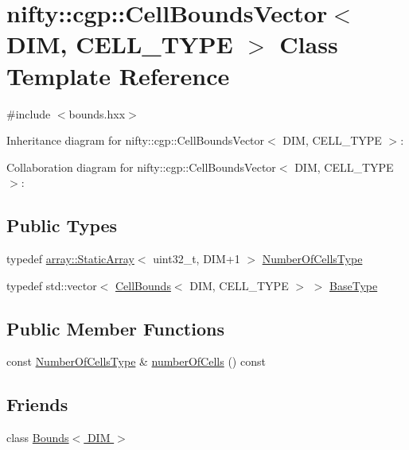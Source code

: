 \hypertarget{classnifty_1_1cgp_1_1CellBoundsVector}{}\section{nifty\+:\+:cgp\+:\+:Cell\+Bounds\+Vector$<$ D\+I\+M, C\+E\+L\+L\+\_\+\+T\+Y\+P\+E $>$ Class Template Reference}
\label{classnifty_1_1cgp_1_1CellBoundsVector}


{\ttfamily \#include $<$bounds.\+hxx$>$}



Inheritance diagram for nifty\+:\+:cgp\+:\+:Cell\+Bounds\+Vector$<$ D\+I\+M, C\+E\+L\+L\+\_\+\+T\+Y\+P\+E $>$\+:


Collaboration diagram for nifty\+:\+:cgp\+:\+:Cell\+Bounds\+Vector$<$ D\+I\+M, C\+E\+L\+L\+\_\+\+T\+Y\+P\+E $>$\+:
\subsection*{Public Types}
\begin{DoxyCompactItemize}
\item 
typedef \hyperlink{namespacenifty_1_1array_a683f151f19c851754e0c6d55ed16a0c2}{array\+::\+Static\+Array}$<$ uint32\+\_\+t, D\+I\+M+1 $>$ \hyperlink{classnifty_1_1cgp_1_1CellBoundsVector_a4db6e267b7ec9e9bfd2db914354c49f9}{Number\+Of\+Cells\+Type}
\item 
typedef std\+::vector$<$ \hyperlink{classnifty_1_1cgp_1_1CellBounds}{Cell\+Bounds}$<$ D\+I\+M, C\+E\+L\+L\+\_\+\+T\+Y\+P\+E $>$ $>$ \hyperlink{classnifty_1_1cgp_1_1CellBoundsVector_ae9467b3782214101f6ca95a0219bbbb6}{Base\+Type}
\end{DoxyCompactItemize}
\subsection*{Public Member Functions}
\begin{DoxyCompactItemize}
\item 
const \hyperlink{classnifty_1_1cgp_1_1CellBoundsVector_a4db6e267b7ec9e9bfd2db914354c49f9}{Number\+Of\+Cells\+Type} \& \hyperlink{classnifty_1_1cgp_1_1CellBoundsVector_a8ee7d5fa77d9e2c0239f37834e459937}{number\+Of\+Cells} () const 
\end{DoxyCompactItemize}
\subsection*{Friends}
\begin{DoxyCompactItemize}
\item 
class \hyperlink{classnifty_1_1cgp_1_1CellBoundsVector_a88cb0f4daae12ff33da3c2a17786cd08}{Bounds$<$ D\+I\+M $>$}
\end{DoxyCompactItemize}


